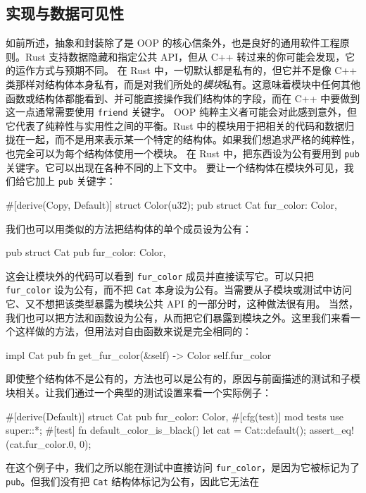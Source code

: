 \subsection{实现与数据可见性}
\label{idx:idx_f5d18fb3}
如前所述，抽象和封装除了是 OOP 的核心信条外，也是良好的通用软件工程原则。Rust 支持数据隐藏和指定公共 API，但从 C++ 转过来的你可能会发现，它的运作方式与预期不同。
在 Rust 中，一切默认都是私有的，但它并不是像 C++ 类那样对结构体本身私有，而是对我们所处的\emph{模块}私有。这意味着模块中任何其他函数或结构体都能看到、并可能直接操作我们结构体的字段，而在 C++ 中要做到这一点通常需要使用 \texttt{friend} 关键字。
OOP 纯粹主义者可能会对此感到意外，但它代表了纯粹性与实用性之间的平衡。Rust 中的模块用于把相关的代码和数据归拢在一起，而不是用来表示某一个特定的结构体。如果我们想追求严格的纯粹性，也完全可以为每个结构体使用一个模块。
在 Rust 中，把东西设为公有要用到 \texttt{pub} 关键字。它可以出现在各种不同的上下文中。
要让一个结构体在模块外可见，我们给它加上 \texttt{pub} 关键字：
\begin{codebox}[rust]
#[derive(Copy, Default)]
struct Color(u32);
pub struct Cat {
      fur_color: Color,
}
\end{codebox}
\label{idx:idx_428b2ff7}
我们也可以用类似的方法把结构体的单个成员设为公有：
\begin{codebox}[rust]
pub struct Cat {
      pub fur_color: Color,
}
\end{codebox}
这会让模块外的代码可以看到 \texttt{fur\_color} 成员并直接读写它。可以只把 \texttt{fur\_color} 设为公有，而不把 \texttt{Cat} 本身设为公有。当需要从子模块或测试中访问它、又不想把该类型暴露为模块公共 API 的一部分时，这种做法很有用。
当然，我们也可以把方法和函数设为公有，从而把它们暴露到模块之外。这里我们来看一个这样做的方法，但用法对自由函数来说是完全相同的：
\begin{codebox}[rust]
impl Cat {
      pub fn get_fur_color(&self) -> Color {
            self.fur_color
      }
}
\end{codebox}
即使整个结构体不是公有的，方法也可以是公有的，原因与前面描述的测试和子模块相关。让我们通过一个典型的测试设置来看一个实际例子：
\begin{codebox}[rust]
#[derive(Default)]
struct Cat {
      pub fur_color: Color,
}
#[cfg(test)]
mod tests {
      use super::*;
      #[test]
      fn default_color_is_black() {
            let cat = Cat::default();
            assert_eq!(cat.fur_color.0, 0);
      }
}
\end{codebox}
\label{idx:idx_64b64821}
在这个例子中，我们之所以能在测试中直接访问 \texttt{fur\_color}，是因为它被标记为了
\texttt{pub}。但我们没有把 \texttt{Cat} 结构体标记为公有，因此它无法在

